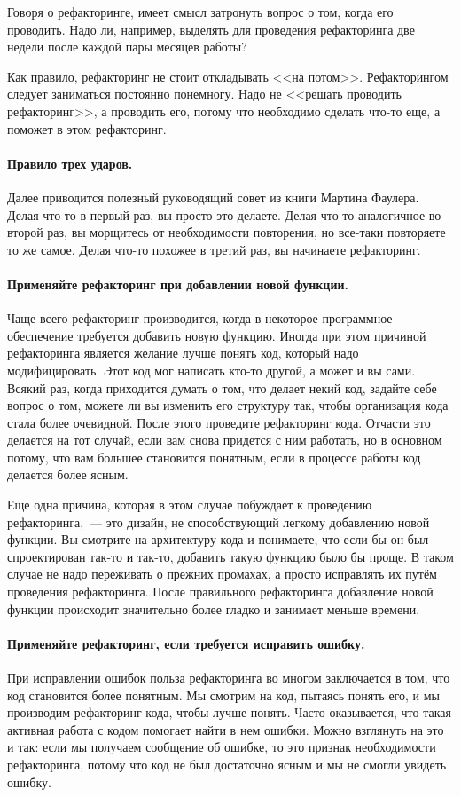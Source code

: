 \documentclass{../../text-style}
\begin{document}
Говоря о рефакторинге, имеет смысл затронуть вопрос о том, когда его проводить. Надо ли, например, выделять для проведения рефакторинга две недели после каждой пары месяцев работы?

Как правило, рефакторинг не стоит откладывать <<на потом>>. Рефакторингом следует заниматься постоянно понемногу. Надо не <<решать проводить рефакторинг>>, а проводить его, потому что необходимо сделать что-то еще, а поможет в этом рефакторинг.

\paragraph{Правило трех ударов.} Далее приводится полезный руководящий совет из книги Мартина Фаулера. Делая что-то в первый раз, вы просто это делаете. Делая что-то аналогичное во второй раз, вы морщитесь от необходимости повторения, но все-таки повторяете то же самое. Делая что-то похожее в третий раз, вы начинаете рефакторинг.

\paragraph{Применяйте рефакторинг при добавлении новой функции.} Чаще всего рефакторинг производится, когда в некоторое программное обеспечение требуется добавить новую функцию. Иногда при этом причиной рефакторинга является желание лучше понять код, который надо модифицировать. Этот код мог написать кто-то другой, а может и вы сами. Всякий раз, когда приходится думать о том, что делает некий код, задайте себе вопрос о том, можете ли вы изменить его структуру так, чтобы организация кода стала более очевидной. После этого проведите рефакторинг кода. Отчасти это делается на тот случай, если вам снова придется с ним работать, но в основном потому, что вам большее становится понятным, если в процессе работы код делается более ясным.

Еще одна причина, которая в этом случае побуждает к проведению рефакторинга,~--- это дизайн, не способствующий легкому добавлению новой функции. Вы смотрите на архитектуру кода и понимаете, что если бы он был спроектирован так-то и так-то, добавить такую функцию было бы проще. В таком случае не надо переживать о прежних промахах, а просто исправлять их путём проведения рефакторинга. После правильного рефакторинга добавление новой функции происходит значительно более гладко и занимает меньше времени.

\paragraph{Применяйте рефакторинг, если требуется исправить ошибку.} При исправлении ошибок польза рефакторинга во многом заключается в том, что код становится более понятным. Мы смотрим на код, пытаясь понять его, и мы производим рефакторинг кода, чтобы лучше понять. Часто оказывается, что такая активная работа с кодом помогает найти в нем ошибки. Можно взглянуть на это и так: если мы получаем сообщение об ошибке, то это признак необходимости рефакторинга, потому что код не был достаточно ясным и мы не смогли увидеть ошибку.
\end{document}
